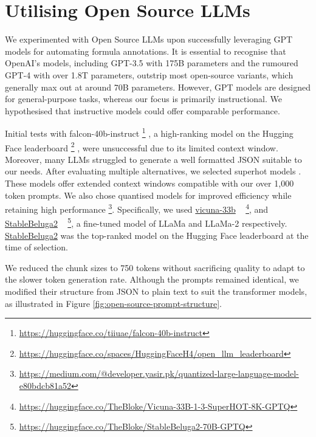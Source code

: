 \section{Utilising Open Source LLMs}

We experimented with Open Source LLMs upon successfully leveraging GPT models for automating formula annotations. It is essential to recognise that OpenAI's models, including GPT-3.5 with 175B parameters and the rumoured GPT-4 with over 1.8T parameters, outstrip most open-source variants, which generally max out at around 70B parameters. However, GPT models are designed for general-purpose tasks, whereas our focus is primarily instructional. We hypothesised that instructive models could offer comparable performance.

Initial tests with falcon-40b-instruct \footnote{\url{https://huggingface.co/tiiuae/falcon-40b-instruct}} \citep{falcon40b, refinedweb, xu2023baize}, a high-ranking model on the Hugging Face leaderboard \footnote{\url{https://huggingface.co/spaces/HuggingFaceH4/open_llm_leaderboard}} \citep{jain2022hugging}, were unsuccessful due to its limited context window. Moreover, many LLMs struggled to generate a well formatted JSON suitable to our needs. After evaluating multiple alternatives, we selected superhot models \citep{chen2023extending}. These models offer extended context windows compatible with our over 1,000 token prompts. We also chose quantised models for improved efficiency while retaining high performance \footnote{\url{https://medium.com/@developer.yasir.pk/quantized-large-language-model-e80bdcb81a52}}. Specifically, we used \href{https://huggingface.co/TheBloke/Vicuna-33B-1-3-SuperHOT-8K-GPTQ}{vicuna-33b} ~\citep{zheng2023judging} \footnote{\url{https://huggingface.co/TheBloke/Vicuna-33B-1-3-SuperHOT-8K-GPTQ}}, and \href{https://huggingface.co/TheBloke/StableBeluga2-70B-GPTQ}{StableBeluga2} ~\citep{StableBelugaModels, touvron2023llama, mukherjee2023orca} \footnote{\url{https://huggingface.co/TheBloke/StableBeluga2-70B-GPTQ}}, a fine-tuned model of LLaMa and LLaMa-2 respectively. \href{https://huggingface.co/TheBloke/StableBeluga2-70B-GPTQ}{StableBeluga2} was the top-ranked model on the Hugging Face leaderboard at the time of selection.

We reduced the chunk sizes to 750 tokens without sacrificing quality to adapt to the slower token generation rate. Although the prompts remained identical, we modified their structure from JSON to plain text to suit the transformer models, as illustrated in Figure \ref{fig:open-source-prompt-structure}. 

